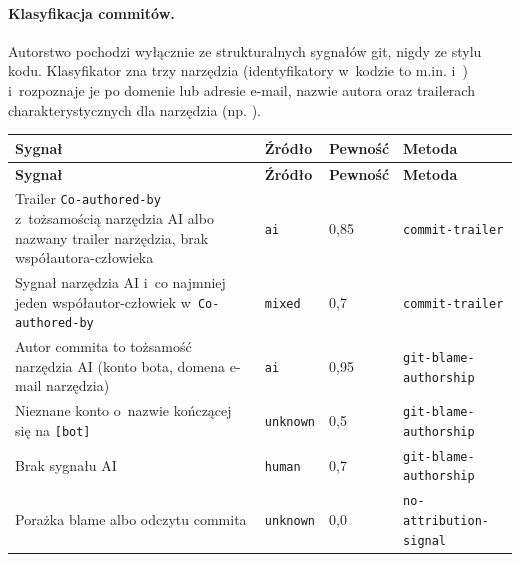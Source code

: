 \paragraph{Klasyfikacja commitów.} Autorstwo pochodzi wyłącznie ze strukturalnych sygnałów
git, nigdy ze stylu kodu. Klasyfikator zna trzy narzędzia (identyfikatory w~kodzie to m.in.
 i~) i~rozpoznaje je po domenie lub adresie
e-mail, nazwie autora oraz trailerach charakterystycznych dla narzędzia
(np. ).

\begin{xltabular}{\linewidth}{@{}>{\raggedright\arraybackslash}X l l >{\raggedright\arraybackslash}p{4.2cm}@{}}
\toprule
\textbf{Sygnał} & \textbf{Źródło} & \textbf{Pewność} & \textbf{Metoda} \\
\midrule
\endfirsthead
\toprule
\textbf{Sygnał} & \textbf{Źródło} & \textbf{Pewność} & \textbf{Metoda} \\
\midrule
\endhead
Trailer \texttt{Co-authored-by} z~tożsamością narzędzia AI albo nazwany trailer narzędzia, brak współautora-człowieka & \texttt{ai} & 0,85 & \texttt{commit-trailer} \\
Sygnał narzędzia AI i~co najmniej jeden współautor-człowiek w~\texttt{Co-authored-by} & \texttt{mixed} & 0,7 & \texttt{commit-trailer} \\
Autor commita to tożsamość narzędzia AI (konto bota, domena e-mail narzędzia) & \texttt{ai} & 0,95 & \texttt{git-blame-authorship} \\
Nieznane konto o~nazwie kończącej się na \texttt{[bot]} & \texttt{unknown} & 0,5 & \texttt{git-blame-authorship} \\
Brak sygnału AI & \texttt{human} & 0,7 & \texttt{git-blame-authorship} \\
Porażka blame albo odczytu commita & \texttt{unknown} & 0,0 & \texttt{no-attribution-signal} \\
\bottomrule
\end{xltabular}

